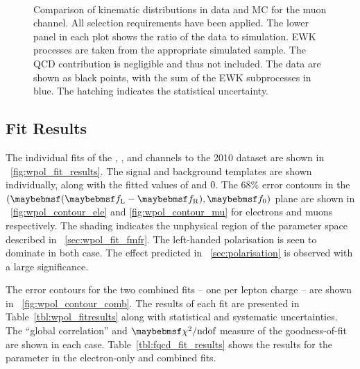 \begin{figure}[h!]
\centering
{}
\\
\caption[Comparison of kinematic distributions in data and \acs{MC} for the
muon channel]{Comparison of kinematic distributions in data and \ac{MC} for the
  muon channel. All selection requirements have been applied. The lower panel in
  each plot shows the ratio of the data to simulation. \ac{EWK} processes are
  taken from the appropriate simulated sample. The \ac{QCD} contribution is
  negligible and thus not included. The data are shown as black points, with the
  sum of the \ac{EWK} subprocesses in blue. The hatching indicates the
  statistical uncertainty.}
\label{fig:wpol_datamc_mu}
\end{figure}

\subsection{Fit Results}
The individual fits of the \Pep, \Pem, \Pgmp and \Pgmm channels to the 2010
dataset are shown in \fig~\ref{fig:wpol_fit_results}. The signal and background
templates are shown individually, along with the fitted values of \fLmfR and
\f0. The 68\% error contours in the $(\fLmfR, \f0)$ plane are shown in
\figs~\ref{fig:wpol_contour_ele} and \ref{fig:wpol_contour_mu} for electrons and
muons respectively. The shading indicates the unphysical region of the parameter
space described in \sec~\ref{sec:wpol_fit_fmfr}. The left-handed polarisation is
seen to dominate in both case. The effect predicted in
\sec~\ref{sec:polarisation} is observed with a large significance.

The error contours for the two combined fits -- one per lepton charge -- are
shown in \fig~\ref{fig:wpol_contour_comb}. The results of each fit are presented
in Table~\ref{tbl:wpol_fitresults} along with statistical and systematic
uncertainties. The ``global correlation'' and $\chisq/\textrm{ndof}$ measure of
the goodness-of-fit are shown in each case. Table~\ref{tbl:fqcd_fit_results}
shows the results for the parameter \fQCD in the electron-only and combined
fits.


